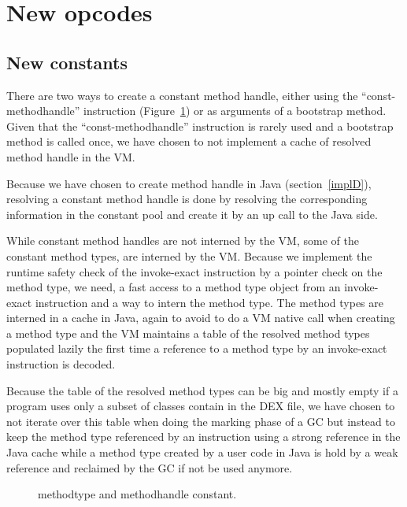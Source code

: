 \documentclass{sig-alternate}
\begin{document}
\section{New opcodes}
\label{newConst}
  \subsection{New constants}

    There are two ways to create a constant method handle, either using the ``const-methodhandle''
    instruction (Figure~\ref{MTMHldc}) or as arguments of a bootstrap method.
    Given that the ``const-methodhandle'' instruction is rarely used and
    a bootstrap method is called once, we have chosen to not implement a cache
    of resolved method handle in the VM.

    Because we have chosen to create method handle in Java (section~\ref{implD}),
    resolving a constant method handle is done by resolving the corresponding information
    in the constant pool and create it by an up call to the Java side.

    While constant method handles are not interned by the VM, some of the constant method types,
    are interned by the VM. Because we implement the runtime safety check of the invoke-exact
    instruction by a pointer check on the method type, we need, a fast access to a method type object
    from an invoke-exact instruction and a way to intern the method type.
    The method types are interned in a cache in Java, again to avoid to do a VM native call
    when creating a method type and the VM maintains  a table of the resolved method types
    populated lazily the first time a reference to a method type by an invoke-exact instruction
    is decoded.

    Because the table of the resolved method types can be big and mostly empty if a program
    uses only a subset of classes contain in the DEX file, we have chosen to not iterate over this table when doing
    the marking phase of a GC but instead to keep the method type referenced by an instruction
    using a strong reference in the Java cache while a method type created by a user code in Java
    is hold by a weak reference and reclaimed by the GC if not be used anymore.    

    \begin{figure}[!ht]
      \centering \resizebox{1.\linewidth}{!}{}
      \caption{methodtype and methodhandle constant.}\vspace{-1em}
      \label{MTMHldc}
    \end{figure}
\end{document}
